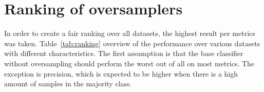 \begin{table}[]
\centering
{}
\caption{Amount of highest f1-scores achieved per oversampler by proportion.}
\label{tab:prop}
\end{table}


\section{Ranking of oversamplers}
In order to create a fair ranking over all datasets, the highest result per metrics was taken. Table~\ref{tab:ranking} overview of the performance over various datasets with different characteristics. The first assumption is that the base classifier without oversampling should perform the worst out of all on most metrics. The exception is precision, which is expected to be higher when there is a high amount of samples in the majority class. 

